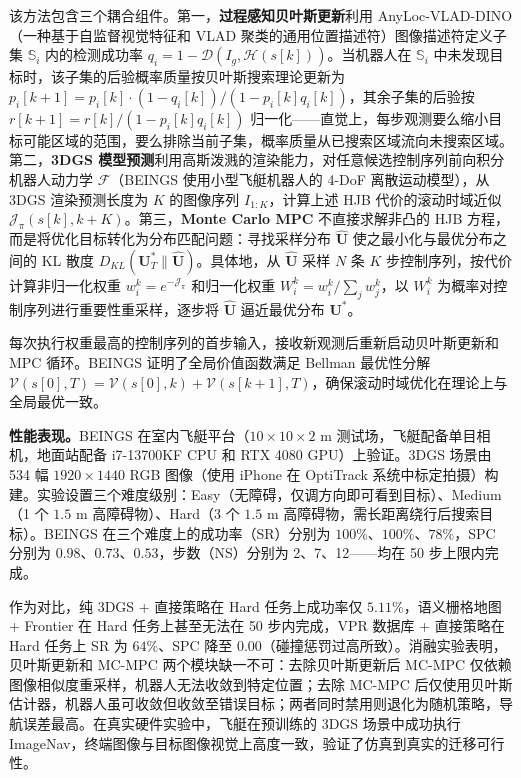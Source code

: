 该方法包含三个耦合组件。第一，\textbf{过程感知贝叶斯更新}利用 AnyLoc-VLAD-DINO（一种基于自监督视觉特征和 VLAD 聚类的通用位置描述符）图像描述符定义子集 $\mathbb{S}_i$ 内的检测成功率 $q_i = 1 - \mathcal{D}(I_g, \mathcal{H}(s[k]))$。当机器人在 $\mathbb{S}_i$ 中未发现目标时，该子集的后验概率质量按贝叶斯搜索理论更新为 $p_i[k\!+\!1] = p_i[k] \cdot (1 - q_i[k]) / (1 - p_i[k] q_i[k])$，其余子集的后验按 $r[k\!+\!1] = r[k] / (1 - p_i[k] q_i[k])$ 归一化——直觉上，每步观测要么缩小目标可能区域的范围，要么排除当前子集，概率质量从已搜索区域流向未搜索区域。第二，\textbf{3DGS 模型预测}利用高斯泼溅的渲染能力，对任意候选控制序列前向积分机器人动力学 $\mathcal{F}$（BEINGS 使用小型飞艇机器人的 4-DoF 离散运动模型），从 3DGS 渲染预测长度为 $K$ 的图像序列 $I_{1:K}$，计算上述 HJB 代价的滚动时域近似 $\mathcal{J}_\pi(s[k], k\!+\!K)$。第三，\textbf{Monte Carlo MPC} 不直接求解非凸的 HJB 方程，而是将优化目标转化为分布匹配问题：寻找采样分布 $\hat{\mathbf{U}}$ 使之最小化与最优分布之间的 KL 散度 $D_{KL}(\mathbf{U}_T^* \| \hat{\mathbf{U}})$。具体地，从 $\hat{\mathbf{U}}$ 采样 $N$ 条 $K$ 步控制序列，按代价计算非归一化权重 $w_i^k = e^{-\mathcal{J}_\pi}$ 和归一化权重 $W_i^k = w_i^k / \sum_j w_j^k$，以 $W_i^k$ 为概率对控制序列进行重要性重采样，逐步将 $\hat{\mathbf{U}}$ 逼近最优分布 $\mathbf{U}^*$。

每次执行权重最高的控制序列的首步输入，接收新观测后重新启动贝叶斯更新和 MPC 循环。BEINGS 证明了全局价值函数满足 Bellman 最优性分解 $\mathcal{V}(s[0], T) = \mathcal{V}(s[0], k) + \mathcal{V}(s[k\!+\!1], T)$，确保滚动时域优化在理论上与全局最优一致。

\textbf{性能表现。}BEINGS 在室内飞艇平台（$10 \times 10 \times 2$ m 测试场，飞艇配备单目相机，地面站配备 i7-13700KF CPU 和 RTX 4080 GPU）上验证。3DGS 场景由 534 幅 $1920 \times 1440$ RGB 图像（使用 iPhone 在 OptiTrack 系统中标定拍摄）构建。实验设置三个难度级别：Easy（无障碍，仅调方向即可看到目标）、Medium（1 个 $1.5$ m 高障碍物）、Hard（3 个 $1.5$ m 高障碍物，需长距离绕行后搜索目标）。BEINGS 在三个难度上的成功率（SR）分别为 $100\%$、$100\%$、$78\%$，SPC 分别为 $0.98$、$0.73$、$0.53$，步数（NS）分别为 2、7、12——均在 50 步上限内完成。

作为对比，纯 3DGS + 直接策略在 Hard 任务上成功率仅 $5.11\%$，语义栅格地图 + Frontier 在 Hard 任务上甚至无法在 50 步内完成，VPR 数据库 + 直接策略在 Hard 任务上 SR 为 $64\%$、SPC 降至 $0.00$（碰撞惩罚过高所致）。消融实验表明，贝叶斯更新和 MC-MPC 两个模块缺一不可：去除贝叶斯更新后 MC-MPC 仅依赖图像相似度重采样，机器人无法收敛到特定位置；去除 MC-MPC 后仅使用贝叶斯估计器，机器人虽可收敛但收敛至错误目标；两者同时禁用则退化为随机策略，导航误差最高。在真实硬件实验中，飞艇在预训练的 3DGS 场景中成功执行 ImageNav，终端图像与目标图像视觉上高度一致，验证了仿真到真实的迁移可行性。

